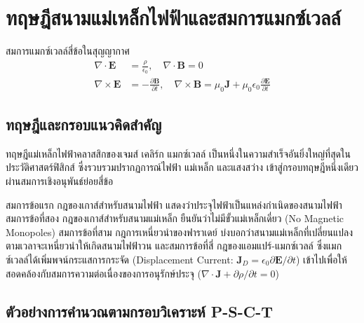 
\chapter{ทฤษฎีสนามแม่เหล็กไฟฟ้าและสมการแมกซ์เวลล์}
\label{ch:chapter04}


\vspace{0.4cm}

\begin{equationsbox}{สมการแมกซ์เวลล์สี่ข้อในสุญญากาศ}
\begin{align}
\nabla \cdot \mathbf{E} &= \frac{\rho}{\epsilon_0}, \quad \nabla \cdot \mathbf{B} = 0 \\
\nabla \times \mathbf{E} &= -\frac{\partial \mathbf{B}}{\partial t}, \quad \nabla \times \mathbf{B} = \mu_0 \mathbf{J} + \mu_0\epsilon_0 \frac{\partial \mathbf{E}}{\partial t}
\end{align}
\end{equationsbox}

\section{ทฤษฎีและกรอบแนวคิดสำคัญ}

ทฤษฎีแม่เหล็กไฟฟ้าคลาสสิกของเจมส์ เคลิร์ก แมกซ์เวลล์ เป็นหนึ่งในความสำเร็จอันยิ่งใหญ่ที่สุดในประวัติศาสตร์ฟิสิกส์ ซึ่งรวบรวมปรากฏการณ์ไฟฟ้า แม่เหล็ก และแสงสว่าง เข้าสู่กรอบทฤษฎีหนึ่งเดียวผ่านสมการเชิงอนุพันธ์ย่อยสี่ข้อ

สมการข้อแรก กฎของเกาส์สำหรับสนามไฟฟ้า แสดงว่าประจุไฟฟ้าเป็นแหล่งกำเนิดของสนามไฟฟ้า สมการข้อที่สอง กฎของเกาส์สำหรับสนามแม่เหล็ก ยืนยันว่าไม่มีขั้วแม่เหล็กเดี่ยว (No Magnetic Monopoles) สมการข้อที่สาม กฎการเหนี่ยวนำของฟาราเดย์ บ่งบอกว่าสนามแม่เหล็กที่เปลี่ยนแปลงตามเวลาจะเหนี่ยวนำให้เกิดสนามไฟฟ้าวน และสมการข้อที่สี่ กฎของแอมแปร์-แมกซ์เวลล์ ซึ่งแมกซ์เวลล์ได้เพิ่มพจน์กระแสการกระจัด (Displacement Current: $\mathbf{J}_D = \epsilon_0 \partial\mathbf{E}/\partial t$) เข้าไปเพื่อให้สอดคล้องกับสมการความต่อเนื่องของการอนุรักษ์ประจุ ($\nabla \cdot \mathbf{J} + \partial\rho/\partial t = 0$)

\section{ตัวอย่างการคำนวณตามกรอบวิเคราะห์ P-S-C-T}

